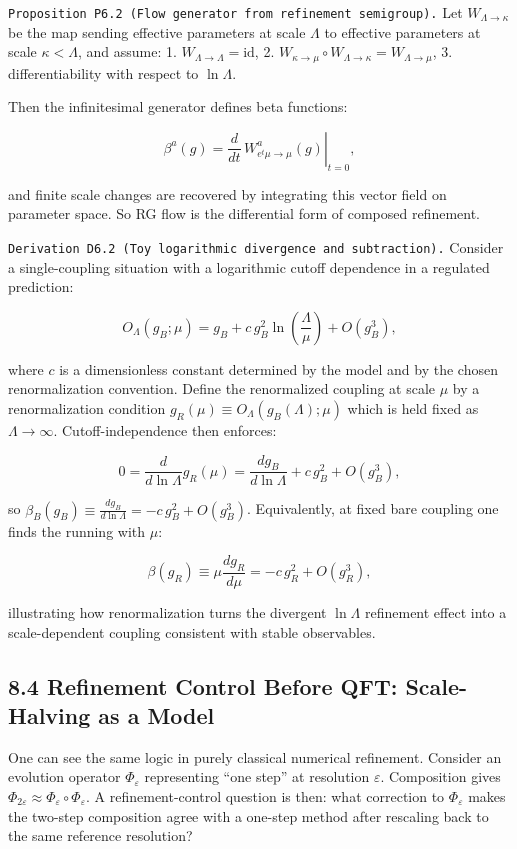 \documentclass[
]{article}
\begin{document}
\texttt{Proposition\ P6.2\ (Flow\ generator\ from\ refinement\ semigroup).}
Let \(W_{\Lambda\to\kappa}\) be the map sending effective parameters at
scale \(\Lambda\) to effective parameters at scale \(\kappa<\Lambda\),
and assume: 1. \(W_{\Lambda\to\Lambda}=\mathrm{id}\), 2.
\(W_{\kappa\to\mu}\circ W_{\Lambda\to\kappa}=W_{\Lambda\to\mu}\), 3.
differentiability with respect to \(\ln\Lambda\).

Then the infinitesimal generator defines beta functions:

\[
\beta^a(g)
=
\left.\frac{d}{dt}\,W^a_{e^t\mu\to\mu}(g)\right|_{t=0},
\]

and finite scale changes are recovered by integrating this vector field
on parameter space. So RG flow is the differential form of composed
refinement.

\texttt{Derivation\ D6.2\ (Toy\ logarithmic\ divergence\ and\ subtraction).}
Consider a single-coupling situation with a logarithmic cutoff
dependence in a regulated prediction:

\[
O_\Lambda(g_B;\mu)=g_B+c\,g_B^2\ln\!\left(\frac{\Lambda}{\mu}\right)+O(g_B^3),
\]

where \(c\) is a dimensionless constant determined by the model and by
the chosen renormalization convention. Define the renormalized coupling
at scale \(\mu\) by a renormalization condition
\(g_R(\mu)\equiv O_\Lambda(g_B(\Lambda);\mu)\) which is held fixed as
\(\Lambda\to\infty\). Cutoff-independence then enforces:

\[
0=\frac{d}{d\ln\Lambda}g_R(\mu)
=\frac{d g_B}{d\ln\Lambda}+c\,g_B^2+O(g_B^3),
\]

so \(\beta_B(g_B)\equiv \frac{d g_B}{d\ln\Lambda}=-c\,g_B^2+O(g_B^3)\).
Equivalently, at fixed bare coupling one finds the running with \(\mu\):

\[
\beta(g_R)\equiv \mu\frac{d g_R}{d\mu}=-c\,g_R^2+O(g_R^3),
\]

illustrating how renormalization turns the divergent \(\ln\Lambda\)
refinement effect into a scale-dependent coupling consistent with stable
observables.

\subsection{8.4 Refinement Control Before QFT: Scale-Halving as a
Model}\label{refinement-control-before-qft-scale-halving-as-a-model}

One can see the same logic in purely classical numerical refinement.
Consider an evolution operator \(\Phi_\varepsilon\) representing ``one
step'' at resolution \(\varepsilon\). Composition gives
\(\Phi_{2\varepsilon}\approx \Phi_\varepsilon\circ\Phi_\varepsilon\). A
refinement-control question is then: what correction to
\(\Phi_\varepsilon\) makes the two-step composition agree with a
one-step method after rescaling back to the same reference resolution?
\end{document}
